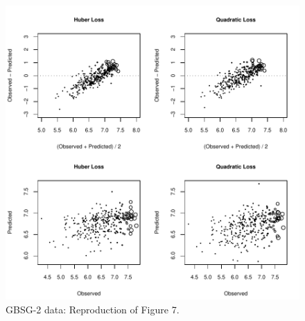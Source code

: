 \documentclass{article}
\begin{document}
\begin{figure}
\begin{center}
\includegraphics{SurvivalEnsembles-Figure7}
\caption{GBSG-2 data: Reproduction of Figure 7.}
\end{center}
\end{figure}

\clearpage



\end{document}
